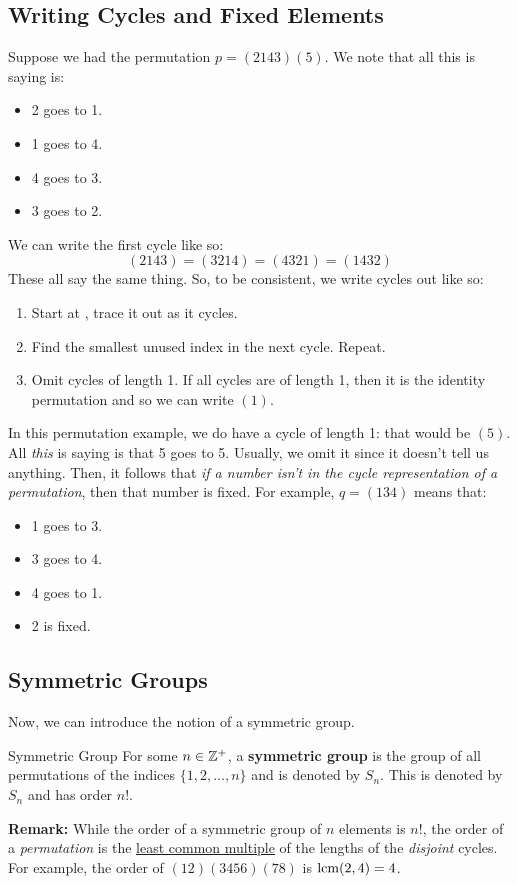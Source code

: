 \documentclass[letterpaper]{article}
\begin{document}
\subsection{Writing Cycles and Fixed Elements}
Suppose we had the permutation $p = (2143)(5)$. We note that all this is saying is: 
\begin{itemize}
    \item 2 goes to 1. 
    \item 1 goes to 4. 
    \item 4 goes to 3. 
    \item 3 goes to 2.
\end{itemize}
We can write the first cycle like so: 
\[(2143) = (3214) = (4321) = (1432)\]
These all say the same thing. So, to be consistent, we write cycles out like so: 
\begin{enumerate}
    \item Start at , trace it out as it cycles. 
    \item Find the smallest unused index in the next cycle. Repeat. 
    \item Omit cycles of length 1. If all cycles are of length 1, then it is the identity permutation and so we can write $(1)$. 
\end{enumerate}
In this permutation example, we do have a cycle of length 1: that would be $(5)$. All \emph{this} is saying is that 5 goes to 5. Usually, we omit it since it doesn't tell us anything. Then, it follows that \emph{if a number isn't in the cycle representation of a permutation}, then that number is fixed. For example, $q = (134)$ means that: 
\begin{itemize}
    \item 1 goes to 3. 
    \item 3 goes to 4. 
    \item 4 goes to 1. 
    \item 2 is fixed. 
\end{itemize}

\subsection{Symmetric Groups}
Now, we can introduce the notion of a symmetric group. 
\begin{definition}{Symmetric Group}{}
    For some $n \in \mathbb{Z}^+$, a \textbf{symmetric group} is the group of all permutations of the indices $\{1, 2, \dots, n\}$ and is denoted by $S_n$. This is denoted by $S_n$ and has order $n!$. 
\end{definition}
\textbf{Remark:} While the order of a symmetric group of $n$ elements is $n!$, the order of a \emph{permutation} is the \underline{least common multiple} of the lengths of the \emph{disjoint} cycles. For example, the order of $(12)(3456)(78)$ is $\operatorname{lcm}(2, 4) = 4$. 
\end{document}
